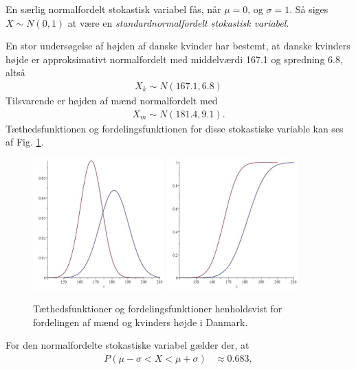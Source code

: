 En særlig normalfordelt stokastisk variabel fås, når $\mu = 0$, og $\sigma = 1$. Så siges $X\sim N(0,1)$ at være en \textit{standardnormalfordelt stokastisk variabel}. 

\begin{exa}
	En stor undersøgelse af højden af danske kvinder har bestemt, at danske kvinders højde er approksimativt normalfordelt med middelværdi 167.1 og spredning 6.8, altså
	\begin{align*}
		X_k \sim N(167.1,6.8)
	\end{align*}
	Tilsvarende er højden af mænd normalfordelt med
	\begin{align*}
		X_m \sim N(181.4, 9.1).
  	\end{align*}	 
  	Tæthedsfunktionen og fordelingsfunktionen for disse stokastiske variable kan ses af Fig. \ref{fig:hojde}.
  	\begin{figure}[H]
  		\center
  		\includegraphics[width=0.45\textwidth]{Billeder/mk.jpg}
  		\includegraphics[width=0.45\textwidth]{Billeder/mkcdf.jpg}
  		\caption{Tæthedsfunktioner og fordelingsfunktioner henholdsvist for fordelingen af mænd og kvinders højde i Danmark. }
  		\label{fig:hojde}
  	\end{figure}
  	For den normalfordelte stokastiske variabel gælder der, at 
  	\begin{align*}
  		P(\mu - \sigma < X < \mu + \sigma) &\approx 0.683,\\

\end{align*}
\end{exa}
